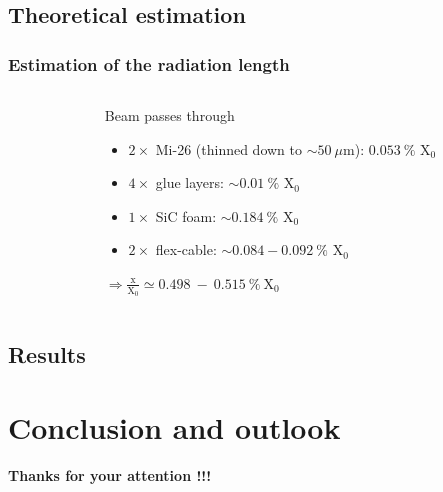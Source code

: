 \documentclass{beamer}
\begin{document}
    \subsection{Theoretical estimation}

    \begin{frame}
      \frametitle{Estimation of the radiation length}

      \begin{columns}[t]
        \begin{column}{5cm}
        \end{column}
        \begin{column}{5cm}
          \begin{block}{Beam passes through}
            \begin{itemize}
              \item $2 \times$ Mi-26 (thinned down to $\sim 50~\mu$m): $0.053~\%$ X$_0$
              \item $4 \times$ glue layers: $\sim 0.01~\%$ X$_0$
              \item $1 \times$ SiC foam: $\sim 0.184~\%$ X$_0$
              \item $2 \times$ flex-cable: $\sim 0.084 - 0.092~\%$ X$_0$
            \end{itemize}
            $\Rightarrow \frac{\text{x}}{\text{X}_0} \simeq 0.498~-~0.515~\%~\text{X}_0$
          \end{block}
        \end{column}
      \end{columns}
    \end{frame}

    \subsection{Results}
    
  \section{Conclusion and outlook} 

  \begin{frame}
    \begin{center}
      \huge
      \textbf{Thanks for your attention !!!}
    \end{center}
  \end{frame}
\end{document}
